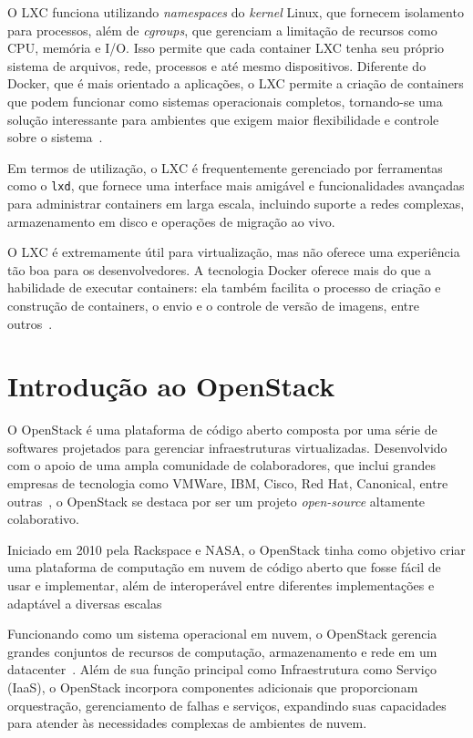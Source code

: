 O LXC funciona utilizando \textit{namespaces} do \textit{kernel} Linux, que fornecem isolamento para processos, além de \textit{cgroups}, que gerenciam a limitação de recursos como CPU, memória e I/O. Isso permite que cada container LXC tenha seu próprio sistema de arquivos, rede, processos e até mesmo dispositivos. Diferente do Docker, que é mais orientado a aplicações, o LXC permite a criação de containers que podem funcionar como sistemas operacionais completos, tornando-se uma solução interessante para ambientes que exigem maior flexibilidade e controle sobre o sistema~\citep{LinuxContainers}.

Em termos de utilização, o LXC é frequentemente gerenciado por ferramentas como o \texttt{lxd}, que fornece uma interface mais amigável e funcionalidades avançadas para administrar containers em larga escala, incluindo suporte a redes complexas, armazenamento em disco e operações de migração ao vivo.

O LXC é extremamente útil para virtualização, mas não oferece uma experiência tão boa para os desenvolvedores. A tecnologia Docker oferece mais do que a habilidade de executar containers: ela também facilita o processo de criação e construção de containers, o envio e o controle de versão de imagens, entre outros~\citep{WhatIsDocker}.


\section{Introdução ao OpenStack}

O OpenStack é uma plataforma de código aberto composta por uma série de softwares projetados para gerenciar infraestruturas virtualizadas. Desenvolvido com o apoio de uma ampla comunidade de colaboradores, que inclui grandes empresas de tecnologia como VMWare, IBM, Cisco, Red Hat, Canonical, entre outras~\citep{OpenStackIndtroductionUFRJ}, o OpenStack se destaca por ser um projeto \textit{open-source} altamente colaborativo.

Iniciado em 2010 pela Rackspace e NASA, o OpenStack tinha como objetivo criar uma plataforma de computação em nuvem de código aberto que fosse fácil de usar e implementar, além de interoperável entre diferentes implementações e adaptável a diversas escalas~\citep{DocumentacaoOpenstack}

Funcionando como um sistema operacional em nuvem, o OpenStack gerencia grandes conjuntos de recursos de computação, armazenamento e rede em um datacenter~\citep{OpenStackSoftware}. Além de sua função principal como Infraestrutura como Serviço (IaaS), o OpenStack incorpora componentes adicionais que proporcionam orquestração, gerenciamento de falhas e serviços, expandindo suas capacidades para atender às necessidades complexas de ambientes de nuvem.

